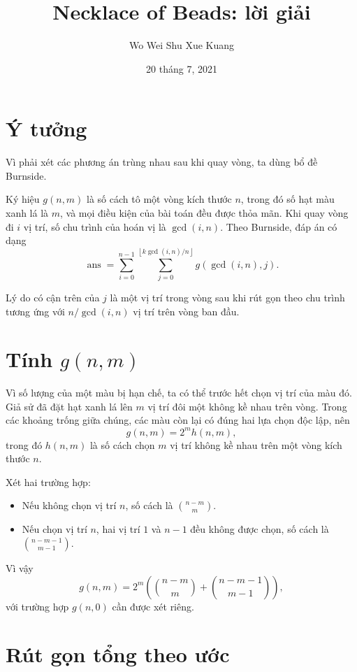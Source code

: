 \documentclass[11pt]{article}
\title{Necklace of Beads: lời giải}
\author{Wo Wei Shu Xue Kuang}
\date{20 tháng 7, 2021}
\newcommand{\ans}{\operatorname{ans}}
\begin{document}
\maketitle


\section{Ý tưởng}

Vì phải xét các phương án trùng nhau sau khi quay vòng, ta dùng bổ đề
Burnside.

Ký hiệu \(g(n,m)\) là số cách tô một vòng kích thước \(n\), trong đó số hạt
màu xanh lá là \(m\), và mọi điều kiện của bài toán đều được thỏa mãn. Khi
quay vòng đi \(i\) vị trí, số chu trình của hoán vị là \(\gcd(i,n)\). Theo
Burnside, đáp án có dạng
\[
  \ans
  =
  \sum_{i=0}^{n-1}
  \sum_{j=0}^{\left\lfloor k\gcd(i,n)/n\right\rfloor}
  g(\gcd(i,n),j).
\]

Lý do có cận trên của \(j\) là một vị trí trong vòng sau khi rút gọn theo
chu trình tương ứng với \(n/\gcd(i,n)\) vị trí trên vòng ban đầu.

\section{\texorpdfstring{Tính \(g(n,m)\)}{Tính g(n,m)}}

Vì số lượng của một màu bị hạn chế, ta có thể trước hết chọn vị trí của màu
đó. Giả sử đã đặt hạt xanh lá lên \(m\) vị trí đôi một không kề nhau trên
vòng. Trong các khoảng trống giữa chúng, các màu còn lại có đúng hai lựa
chọn độc lập, nên
\[
  g(n,m)=2^m h(n,m),
\]
trong đó \(h(n,m)\) là số cách chọn \(m\) vị trí không kề nhau trên một vòng
kích thước \(n\).

Xét hai trường hợp:
\begin{itemize}
  \item Nếu không chọn vị trí \(n\), số cách là \(\binom{n-m}{m}\).
  \item Nếu chọn vị trí \(n\), hai vị trí \(1\) và \(n-1\) đều không được
  chọn, số cách là \(\binom{n-m-1}{m-1}\).
\end{itemize}
Vì vậy
\[
  g(n,m)=2^m\left(\binom{n-m}{m}+\binom{n-m-1}{m-1}\right),
\]
với trường hợp \(g(n,0)\) cần được xét riêng.

\section{Rút gọn tổng theo ước}
\end{document}
